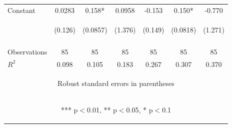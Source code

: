 \begin{center}
\begin{tabular}{lcccccc}
Constant & 0.0283 & 0.158* & 0.0958 & -0.153 & 0.150* & -0.770 \\
 & \begin{footnotesize}(0.126)\end{footnotesize} & \begin{footnotesize}(0.0857)\end{footnotesize} & \begin{footnotesize}(1.376)\end{footnotesize} & \begin{footnotesize}(0.149)\end{footnotesize} & \begin{footnotesize}(0.0818)\end{footnotesize} & \begin{footnotesize}(1.271)\end{footnotesize} \\
\vspace{4pt} & \begin{footnotesize}\end{footnotesize} & \begin{footnotesize}\end{footnotesize} & \begin{footnotesize}\end{footnotesize} & \begin{footnotesize}\end{footnotesize} & \begin{footnotesize}\end{footnotesize} & \begin{footnotesize}\end{footnotesize} \\
Observations & 85 & 85 & 85 & 85 & 85 & 85 \\
 $R^2$ & 0.098 & 0.105 & 0.183 & 0.267 & 0.307 & 0.370 \\ \hline
\multicolumn{7}{c}{\begin{footnotesize} Robust standard errors in parentheses\end{footnotesize}} \\
\multicolumn{7}{c}{\begin{footnotesize} *** p$<$0.01, ** p$<$0.05, * p$<$0.1\end{footnotesize}} \\
\end{tabular}
\end{center}

